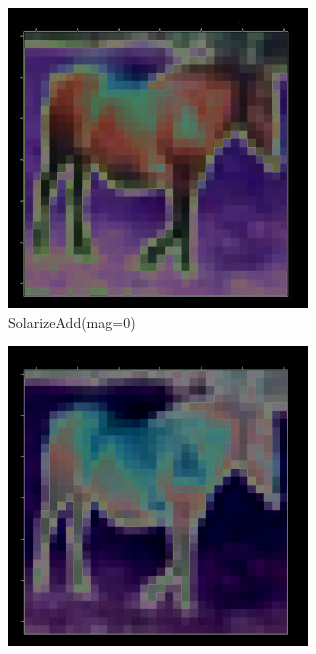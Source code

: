 \documentclass[onecolumn]{ujarticle}   %
\begin{document}
    \begin{figure}[h]
      \vspace{-4mm}
      \centering

      \begin{subfigure}{0.3\columnwidth}
        \centering
        \includegraphics[width=1.0\columnwidth]{transform_test/SolarizeAdd_0.png}
        \caption{SolarizeAdd(mag=0)}
        \label{fig:SolarizeAdd_0}
      \end{subfigure}
      \begin{subfigure}{0.3\columnwidth}
        \centering
        \includegraphics[width=1.0\columnwidth]{transform_test/SolarizeAdd_15.png}

\end{subfigure}
\end{figure}
\end{document}
